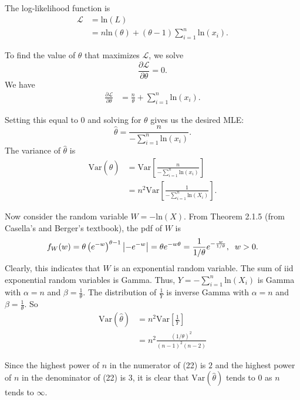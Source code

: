\documentclass{article}
\begin{document}
\noindent The log-likelihood function is
\begin{align}
\mathscr{L} &= \text{ln}(L) \\
&= n\text{ln}(\theta) + (\theta - 1)\sum\limits_{i=1}^n \text{ln}(x_i).
\end{align}

\noindent To find the value of $\theta$ that maximizes $\mathscr{L}$, we solve $$\frac{\partial \mathscr{L}}{\partial \theta} = 0.$$  We have
\begin{align}
\frac{\partial \mathscr{L}}{\partial \theta} &= \frac{n}{\theta} + \sum\limits_{i=1}^n \text{ln}(x_i).
\end{align}

\noindent Setting this equal to $0$ and solving for $\theta$ gives us the desired MLE: $$\hat{\theta} = \frac{n}{-\sum\limits_{i=1}^n \text{ln}(x_i)}.$$ The variance of $\hat{\theta}$ is 
\begin{align}
\text{Var}(\hat{\theta}) &= \text{Var}\left[\frac{n}{-\sum\limits_{i=1}^n \text{ln}(x_i)}\right] \\
&= n^2\text{Var}\left[ \frac{1}{-\sum\limits_{i=1}^n\text{ln}(X_i)} \right].
\end{align}

\noindent Now consider the random variable $W = -\text{ln}(X).$ From Theorem 2.1.5 (from Casella's and Berger's textbook), the pdf of $W$ is $$f_W(w) = \theta\left(e^{-w}\right)^{\theta - 1}\left|-e^{-w}\right| = \theta e^{-w\theta} = \frac{1}{1/\theta}e^{-\frac{w}{1/\theta}}, \hspace{2mm} w > 0.$$ Clearly, this indicates that $W$ is an exponential random variable.  The sum of iid exponential random variables is Gamma. Thus, $Y=-\sum\limits_{i=1}^n\text{ln}(X_i)$ is Gamma with $\alpha = n$ and $\beta = \frac{1}{\theta}$.  The distribution of $\frac{1}{Y}$ is inverse Gamma with $\alpha = n$ and $\beta = \frac{1}{\theta}$.  So
\begin{align}
\text{Var}(\hat{\theta}) &= n^2\text{Var}\left[\frac{1}{Y}\right] \\
&= n^2\frac{(1/\theta)^2}{(n-1)^2(n-2)} 
\end{align}

\noindent Since the highest power of $n$ in the numerator of (22) is $2$ and the highest power of $n$ in the denominator of (22) is $3$, it is clear that $\text{Var}(\hat{\theta})$ tends to $0$ as $n$ tends to $\infty$. 

\vspace{5mm}
\end{document}
